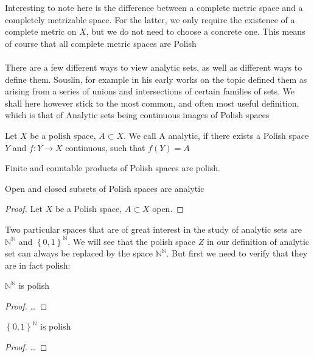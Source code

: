 \documentclass[10pt, a4paper, titlepage]{article}
\numberwithin{equation}{section}
\begin{document}
Interesting to note here is the difference between a complete metric space and a completely metrizable space.
For the latter, we only require the existence of a complete metric on $X$, but we do not need to choose a concrete one.
This means of course that all complete metric spaces are Polish\\
\\
There are a few different ways to view analytic sets, as well as different ways to define them. 
Souslin, for example in his early works on the topic defined them as arising from a series of unions and intersections of certain families of sets.
We shall here however stick to the most common, and often most useful  definition, which is that of Analytic sets being continuous images of Polish spaces 

\begin{definition}
	Let $X$ be a polish space, $A \subset X$. We call A analytic, if there exists a Polish space $Y$ and  $f:Y \to X$ continuous, such that  $f(Y) = A$

\end{definition}


\begin{lemma}
	Finite and countable products of Polish spaces are polish.
\end{lemma}


\begin{theorem}
	Open and closed subsets of Polish spaces are analytic
\end{theorem}

\begin{proof}
	Let $X$ be a Polish space, $A \subset X$ open.
\end{proof}

Two particular spaces that are of great interest in the study of analytic sets are $\mathbb{N}^{\mathbb{N}}$ and $\left\{ 0,1 \right\}^{\mathbb{N}} $.
We will see that the polish space $Z$ in our definition of analytic set can always be replaced by the space $\mathbb{N}^{\mathbb{N}}$. But first we need to verify that they are in fact polish:

\begin{theorem}
	$\mathbb{N}^\mathbb{N}$ is polish
\end{theorem}
\begin{proof}
	\ldots		
\end{proof}

\begin{theorem}
	$\left\{ 0,1 \right\}^\mathbb{N}$ is polish
\end{theorem}
\begin{proof}
	\ldots	
\end{proof}
\end{document}
